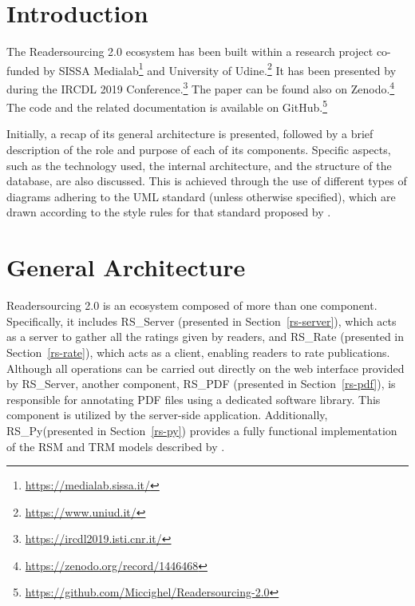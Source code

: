 \documentclass[a4paper, english]{article}
\newcommand{\rsserver}{RS\_Server\xspace}
\newcommand{\rspdf}{RS\_PDF\xspace}
\newcommand{\rsrate}{RS\_Rate\xspace}
\newcommand{\rspy}{RS\_Py\xspace}
\begin{document}
\maketitle

\tableofcontents

\newpage

\listoffigures

\newpage

\listoftables

\newpage


\section{Introduction}


The Readersourcing 2.0 ecosystem has been built within a research project co-funded by SISSA Medialab\footnote{\url{https://medialab.sissa.it/}} and University of Udine.\footnote{\url{https://www.uniud.it/}} It has been presented by \citet{Soprano2019} during the IRCDL 2019 Conference.\footnote{\url{https://ircdl2019.isti.cnr.it/}} The paper can be found also on Zenodo.\footnote{\url{https://zenodo.org/record/1446468}} The code and the related documentation is available on GitHub.\footnote{\url{https://github.com/Miccighel/Readersourcing-2.0}}

Initially, a recap of its general architecture is presented, followed by a brief description of the role and purpose of each of its components. Specific aspects, such as the technology used, the internal architecture, and the structure of the database, are also discussed. This is achieved through the use of different types of diagrams adhering to the UML standard (unless otherwise specified), which are drawn according to the style rules for that standard proposed by \citet{Fowler03}.

\section{General Architecture}

Readersourcing 2.0 is an ecosystem composed of more than one component. Specifically, it includes \rsserver \cite{RS-Server} (presented in Section~\ref{rs-server}), which acts as a server to gather all the ratings given by readers, and \rsrate \cite{RS-Rate} (presented in Section~\ref{rs-rate}), which acts as a client, enabling readers to rate publications. Although all operations can be carried out directly on the web interface provided by \rsserver, another component, \rspdf \cite{RS-PDF} (presented in Section~\ref{rs-pdf}), is responsible for annotating PDF files using a dedicated software library. This component is utilized by the server-side application. Additionally, \rspy (presented in Section~\ref{rs-py}) provides a fully functional implementation of the RSM and TRM models described by \citet{Soprano2019}. 
\end{document}
